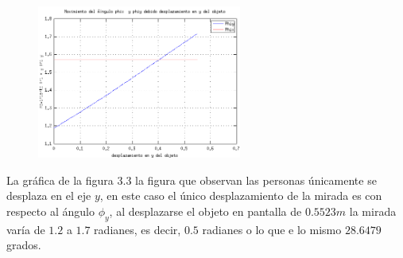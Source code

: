 \documentclass[paper=a4, fontsize=11pt]{scrartcl} %
\numberwithin{equation}{section} %
\numberwithin{figure}{section} %
\numberwithin{table}{section} %
\begin{document}
  \begin{figure}[htbp]
  	\centering
  	\includegraphics[width=0.6\textwidth]{figure2}
  	\caption{}\label{fig: figura}
  \end{figure}
La gráfica de la figura 3.3	la figura que observan las personas únicamente se desplaza en el eje $y$, en este caso el único desplazamiento de la mirada es con respecto al ángulo  $\phi_y$, al desplazarse el objeto en pantalla de $0.5523m$ la mirada varía de $1.2$ a $1.7$ radianes, es decir, $0.5$ radianes o lo que e lo mismo $28.6479$ grados.
\end{document}
